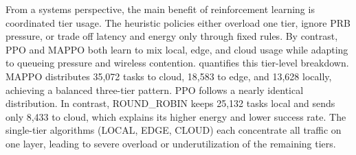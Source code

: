 From a systems perspective, the main benefit of reinforcement learning is coordinated tier usage. The heuristic policies either overload one tier, ignore PRB pressure, or trade off latency and energy only through fixed rules. By contrast, PPO and MAPPO both learn to mix local, edge, and cloud usage while adapting to queueing pressure and wireless contention.  quantifies this tier-level breakdown. MAPPO distributes 35,072 tasks to cloud, 18,583 to edge, and 13,628 locally, achieving a balanced three-tier pattern. PPO follows a nearly identical distribution. In contrast, ROUND\_ROBIN keeps 25,132 tasks local and sends only 8,433 to cloud, which explains its higher energy and lower success rate. The single-tier algorithms (LOCAL, EDGE, CLOUD) each concentrate all traffic on one layer, leading to severe overload or underutilization of the remaining tiers.

\begin{table}[htbp]
    \centering
    \footnotesize
\caption{Per-tier task distribution and success counts. RL policies achieve near-perfect success on every tier, while heuristics suffer heavy losses on the tiers they overload.}
    \label{tab:tier-distribution}
\end{table}

